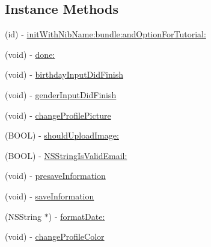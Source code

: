 \subsection*{Instance Methods}
\begin{DoxyCompactItemize}
\item 
(id) -\/ \hyperlink{interface_e_s_edit_profile_view_controller_a4246647a3b2b14ac48f2d1662f8b2eac}{init\+With\+Nib\+Name\+:bundle\+:and\+Option\+For\+Tutorial\+:}
\item 
(void) -\/ \hyperlink{interface_e_s_edit_profile_view_controller_a1243ace38dad20e214359e3596561c3b}{done\+:}
\item 
(void) -\/ \hyperlink{interface_e_s_edit_profile_view_controller_a944cb142a54a3eb1be14beb031689cac}{birthday\+Input\+Did\+Finish}
\item 
(void) -\/ \hyperlink{interface_e_s_edit_profile_view_controller_a94e04a7a99687822e3fe447430aa79f6}{gender\+Input\+Did\+Finish}
\item 
(void) -\/ \hyperlink{interface_e_s_edit_profile_view_controller_a1b9069d86ecfe93e50c2b30470da6285}{change\+Profile\+Picture}
\item 
(B\+O\+O\+L) -\/ \hyperlink{interface_e_s_edit_profile_view_controller_a2ee04162cefe80ea1af2a17ef8b2f977}{should\+Upload\+Image\+:}
\item 
(B\+O\+O\+L) -\/ \hyperlink{interface_e_s_edit_profile_view_controller_aecf411d1f7eaa2a651c80461c838cfc3}{N\+S\+String\+Is\+Valid\+Email\+:}
\item 
(void) -\/ \hyperlink{interface_e_s_edit_profile_view_controller_a4d19d2a70512bbc5c4605b42f4bb9760}{presave\+Information}
\item 
(void) -\/ \hyperlink{interface_e_s_edit_profile_view_controller_ab3f4cd008900d590921ad16c2823b772}{save\+Information}
\item 
(N\+S\+String $\ast$) -\/ \hyperlink{interface_e_s_edit_profile_view_controller_aa2157deba849a53c1ab544f9d85d605d}{format\+Date\+:}
\item 
(void) -\/ \hyperlink{interface_e_s_edit_profile_view_controller_aa2f3e34f77d9c2b83cbfa68dadc1233f}{change\+Profile\+Color}
\end{DoxyCompactItemize}
